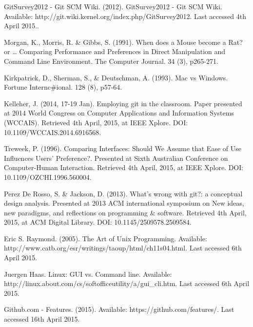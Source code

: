 \documentclass[12pt,a4paper,article,compsoc]{IEEEtran}
\begin{document}
		\newpage
		\begin{thebibliography}{1}
			
			GitSurvey2012 - Git SCM Wiki. (2012). GitSurvey2012 - Git SCM Wiki. Available: http://git.wiki.kernel.org/index.php/GitSurvey2012. Last accessed 4th April 2015..
			
			Morgan, K., Morris, R. \& Gibbs, S. (1991). When does a Mouse become a Rat? or … Comparing Performance and Preferences in Direct Manipulation and Command Line Environment. The Computer Journal. 34 (3), p265-271.
			
			Kirkpatrick, D., Sherman, S., \& Deutschman, A. (1993). Mac vs Windows. Fortune Internc\#ional. 128 (8), p57-64.
			
			Kelleher, J. (2014, 17-19 Jan). Employing git in the classroom. Paper presented at 2014 World Congress on Computer Applications and Information Systems (WCCAIS). Retrieved 4th April, 2015, at IEEE Xplore. DOI: 10.1109/WCCAIS.2014.6916568.
			
			Treweek, P. (1996). Comparing Interfaces: Should We Assume that Ease of Use Influences Users' Preference?. Presented at Sixth Australian Conference on Computer-Human Interaction. Retrieved 4th April, 2015, at IEEE Xplore. DOI: 10.1109/OZCHI.1996.560004.
			
			
			Perez De Rosso, S. \& Jackson, D. (2013). What's wrong with git?: a conceptual design analysis. Presented at 2013 ACM international symposium on New ideas, new paradigms, and reflections on programming \& software. Retrieved 4th April, 2015, at ACM Digital Library. DOI: 10.1145/2509578.2509584.
			
			Eric S. Raymond. (2005). The Art of Unix Programming.
			Available: http://www.catb.org/esr/writings/taoup/html/ch11s04.html.
			Last accessed 6th April 2015.
			
			Juergen Haas. Linux: GUI vs. Command line. Available: http://linux.about.com/cs/softofficeutility/a/gui\_cli.htm. Last accessed 6th April 2015.
			
			Github.com - Features. (2015). Available: https://github.com/features/. Last accessed 16th April 2015.
			

\end{thebibliography}
\end{document}
